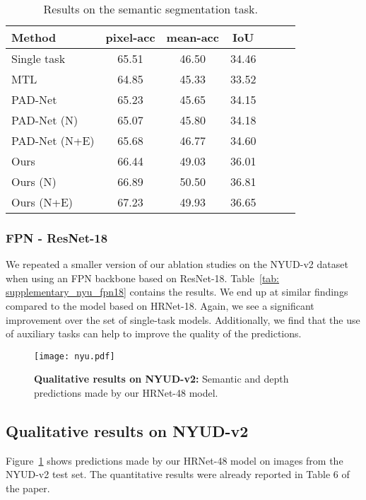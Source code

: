 \documentclass[runningheads]{llncs}
\begin{document}
\begin{table}[t]
\bigskip
   
\begin{subtable}{1.0\linewidth} 
\centering
\caption{Results on the semantic segmentation task.}
\label{tab: nyu_sem_fpn18}
\footnotesize{
\begin{tabular}{|l|c|c|c|c|c|c|}
\hline
Method & pixel-acc  & mean-acc  & IoU  \\
\hline
Single task & 65.51 & 46.50 & 34.46 \\
MTL & 64.85 & 45.33 & 33.52 \\
\hline
PAD-Net & 65.23 & 45.65 & 34.15 \\
PAD-Net (N) & 65.07 & 45.80 & 34.18 \\
PAD-Net (N+E) & 65.68 & 46.77 & 34.60 \\
\hline
Ours & 66.44 & 49.03 & 36.01 \\
Ours (N) & 66.89 & 50.50 & 36.81 \\
Ours (N+E) & 67.23 & 49.93 & 36.65 \\
\hline
\end{tabular}}
\end{subtable}\end{table}

\subsubsection{FPN - ResNet-18}
\label{subsec: supl_nyud_fpn18}
We repeated a smaller version of our ablation studies on the NYUD-v2 dataset when using an FPN backbone based on ResNet-18. Table~\ref{tab: supplementary_nyu_fpn18} contains the results. We end up at similar findings compared to the model based on HRNet-18. Again, we see a significant improvement over the set of single-task models. Additionally, we find that the use of auxiliary tasks can help to improve the quality of the predictions.

\begin{figure}[t]
\centering
\texttt{[image: nyu.pdf]}
\caption{\textbf{Qualitative results on NYUD-v2:} Semantic and depth predictions made by our HRNet-48 model.}
\label{fig: nyu_qualitative}
\end{figure}

\subsection{Qualitative results on NYUD-v2}
Figure~\ref{fig: nyu_qualitative} shows predictions made by our HRNet-48 model on images from the NYUD-v2 test set. The quantitative results were already reported in Table 6 of the paper.

\clearpage


\end{document}
